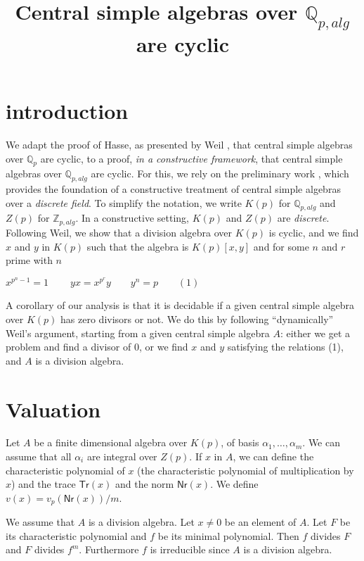 \documentclass[10pt,a4paper]{article}
\newcommand{\ints}{\mathbb{Z}}
\newcommand{\rats}{\mathbb{Q}}
\newcommand\Tr{\mathsf{Tr}}
\newcommand\Nm{\mathsf{Nr}}
\begin{document}
\title{Central simple algebras over $\rats_{p,alg}$ are cyclic}

\author{}
\date{}
\maketitle


\section*{introduction}

We adapt the proof of Hasse, as presented by Weil \cite{Weil}, that central simple algebras
over $\rats_p$ are cyclic, to a proof,  {\em in a constructive framework}, that central simple algebras over $\rats_{p,alg}$ are
cyclic. For this, we rely on the preliminary work \cite{CLN1},
which provides the foundation of a constructive treatment of central simple algebras over
a {\em discrete field}. To simplify the notation, we write $K(p)$ for $\rats_{p,alg}$
and $Z(p)$ for $\ints_{p,alg}$. In a constructive setting, $K(p)$ and $Z(p)$ are {\em discrete}.
Following Weil, we show that a division algebra over $K(p)$ is cyclic, and we find $x$ and $y$
in $K(p)$ such that the algebra is $K(p)[x,y]$ and for some $n$ and $r$ prime with $n$
\begin{center}
  $x^{p^n-1} = 1~~~~~~~~~~yx = x^{p^r} y~~~~~~~~~y^n = p~~~~~~~~~(1)$
\end{center}

A corollary of our analysis is that it is decidable if a given central simple algebra over $K(p)$
has zero divisors or not. We do this by following ``dynamically'' Weil's argument, starting from
a given central simple algebra $A$: either we get a problem and find a divisor of $0$, or we find $x$ and $y$
satisfying the relations (1), and $A$ is a division algebra.

\section{Valuation}

Let $A$ be a finite dimensional algebra over $K(p)$, of basis $\alpha_1,\dots,\alpha_m$.
We can assume that all $\alpha_i$ are integral over $Z(p)$.
If $x$ in $A$, we can define the characteristic
polynomial of $x$ (the characteristic polynomial of multiplication by $x$) and the trace $\Tr(x)$
and the norm $\Nm(x)$.  We define $v(x) = v_p(\Nm(x))/m$.

We assume that $A$ is a division algebra. Let $x\neq 0$ be an element of $A$. Let $F$ be its
characteristic polynomial and $f$ be its minimal polynomial. Then $f$ divides $F$ and $F$ divides $f^m$.
Furthermore $f$ is irreducible since $A$ is a division algebra.
\end{document}

